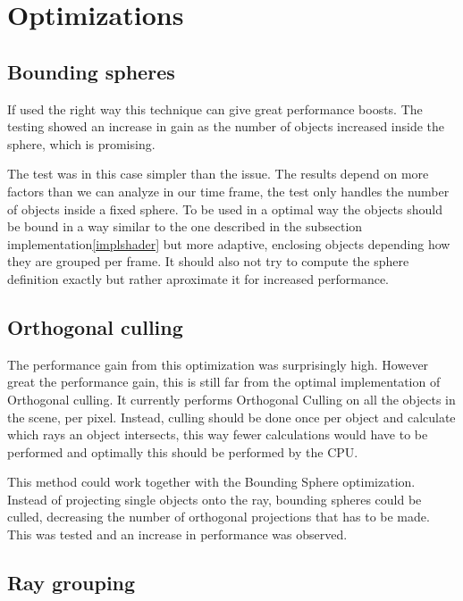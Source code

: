 	\section{Optimizations} \label{optimization}

		\subsection{Bounding spheres}

			If used the right way this technique can give great performance 
			boosts. The testing showed an increase in gain as the number of 
			objects increased inside the sphere, which is promising.

			The test was in this case simpler than the issue. The results depend
			on more factors than we can analyze in our time frame, the test only handles the 
			number of objects inside a fixed sphere. To be used in a optimal way
			the objects should be bound in a way similar to the one described in
			the subsection implementation\ref{implshader} but more adaptive, 
			enclosing objects depending how they are grouped per frame. It should also not try to compute the sphere definition exactly but rather aproximate it for increased performance. 

		\subsection{Orthogonal culling}

			The performance gain from this optimization was surprisingly high. However great the performance gain, this
			is still far from the optimal implementation of Orthogonal culling. 
			It currently performs Orthogonal Culling on all the objects in 
			the scene, per pixel. 
			Instead, culling should be done once per object and calculate 
			which rays an object intersects, this way fewer calculations would
			have to be performed and optimally this should be performed by the
			CPU. 

			This method could work together with the Bounding Sphere
			optimization. Instead of projecting single objects onto the ray,
			bounding spheres could be culled, decreasing the number of
			orthogonal projections that has to be made. This was tested and
			an increase in performance was observed.
			
		\subsection{Ray grouping}

